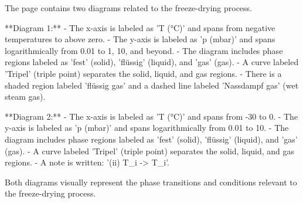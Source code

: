 The page contains two diagrams related to the freeze-drying process.  

**Diagram 1:**  
- The x-axis is labeled as 'T (°C)' and spans from negative temperatures to above zero.  
- The y-axis is labeled as 'p (mbar)' and spans logarithmically from 0.01 to 1, 10, and beyond.  
- The diagram includes phase regions labeled as 'fest' (solid), 'flüssig' (liquid), and 'gas' (gas).  
- A curve labeled 'Tripel' (triple point) separates the solid, liquid, and gas regions.  
- There is a shaded region labeled 'flüssig gas' and a dashed line labeled 'Nassdampf gas' (wet steam gas).  

**Diagram 2:**  
- The x-axis is labeled as 'T (°C)' and spans from -30 to 0.  
- The y-axis is labeled as 'p (mbar)' and spans logarithmically from 0.01 to 10.  
- The diagram includes phase regions labeled as 'fest' (solid), 'flüssig' (liquid), and 'gas' (gas).  
- A curve labeled 'Tripel' (triple point) separates the solid, liquid, and gas regions.  
- A note is written: '(ii) T_i -> T_i'.  

Both diagrams visually represent the phase transitions and conditions relevant to the freeze-drying process.